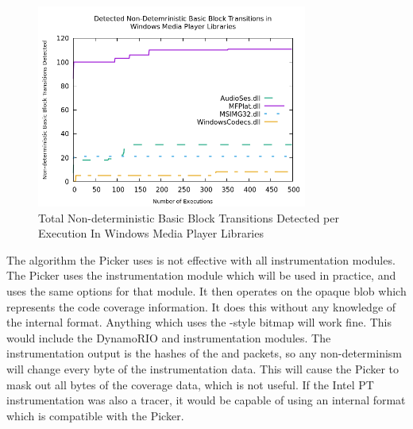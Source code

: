 \begin{figure}[htb]
\centering
\includegraphics[width=3.5in]{picker.png}
\caption{Total Non-deterministic Basic Block Transitions Detected per Execution In Windows Media Player Libraries}
\label{fig:picker}
\end{figure}

The algorithm the Picker uses is not effective with all instrumentation
modules. The Picker uses the instrumentation module which will be used in
practice, and uses the same options for that module. It then operates on
the opaque blob which represents the code coverage information.  It does
this without any knowledge of the internal format.  Anything which uses the
\AFL{}-style bitmap will work fine.  This would include the DynamoRIO and
\AFL{} instrumentation modules. The \IPT{} instrumentation output is the hashes
of the \TNT{} and \TIP{} packets, so any non-determinism will change every byte of
the instrumentation data.  This will cause the Picker to mask out all bytes of
the coverage data, which is not useful. If the Intel PT
instrumentation was also a tracer, it would be capable of using an internal
format which is compatible with the Picker.
